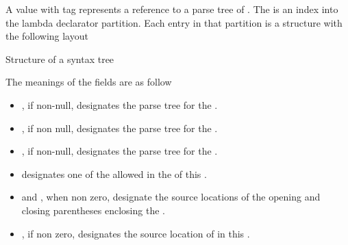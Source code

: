 A  value with tag  represents a reference
to a parse tree of .  The  is an index into the lambda declarator
partition. Each entry in that partition is a structure with the following layout
%
\begin{Structure}
	\caption{Structure of a  syntax tree}
	\label{fig:ifc:SyntaxSort:LambdaDeclarator}
\end{Structure}
%
The meanings of the fields are as follow
\begin{itemize}
	\item {}, if non-null, designates the parse tree for the .
	\item {}, if non null, designates the parse tree for the .
	\item {}, if non-null, designates the parse tree for the .
	\item {} designates one of the allowed  in the  
	of this .
	\item {} and , when non zero, designate the source locations of the
	opening and closing parentheses enclosing the .
	\item {}, if non zero, designates the source location of  in this .
\end{itemize}



\subsection{}
\label{sec:ifc:SyntaxSort:CaptureDefault}

